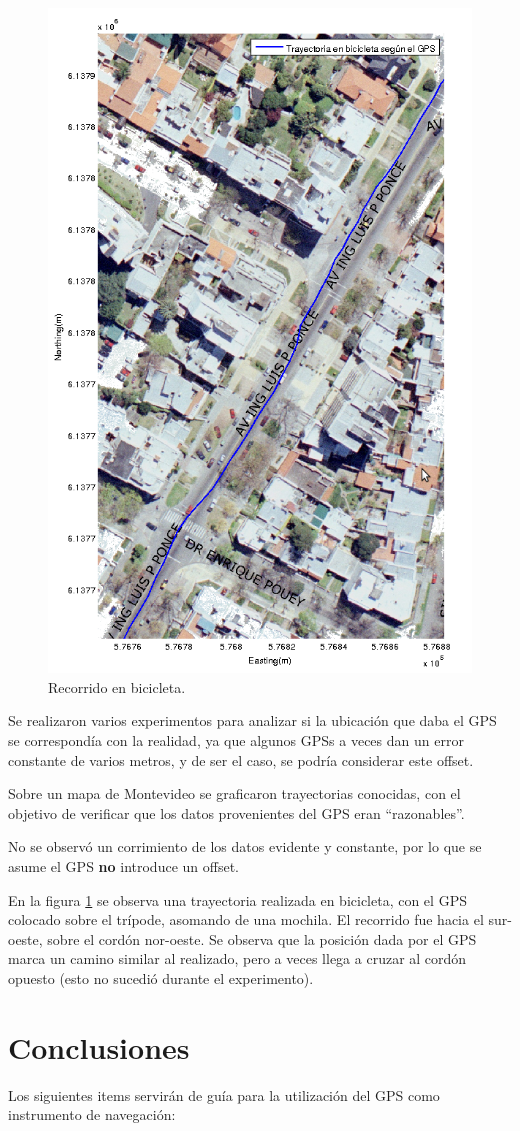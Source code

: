 \documentclass[main]{subfiles}
\begin{document}
\begin{figure}
  \begin{center}
\vspace{-80pt}
  \includegraphics[height=.5\textwidth]{./pics_gps/ponce.png}
  \end{center}
\vspace{-20pt}
  \caption{Recorrido en bicicleta.}
  \label{fig:ponce.png}
\vspace{-10pt}
\end{figure}

Se realizaron varios experimentos para analizar si la ubicación que daba el GPS se correspondía con la realidad, ya que algunos GPSs a veces dan un error constante de varios metros, y de ser el caso, se podría considerar este offset.

Sobre un mapa de Montevideo se graficaron trayectorias conocidas, con el objetivo de verificar que los datos provenientes del GPS eran ``razonables''.

No se observ\'o un corrimiento de los datos evidente y constante, por lo que se asume el GPS \textbf{no} introduce un offset.

En la figura \ref{fig:ponce.png} se observa una trayectoria realizada en bicicleta, con el GPS colocado sobre el trípode, asomando de una mochila. El recorrido fue hacia el sur-oeste, sobre el cord\'on nor-oeste. Se observa que la posici\'on dada por el GPS marca un camino similar al realizado, pero a veces llega a cruzar al cord\'on opuesto (esto no sucedi\'o durante el experimento).

\section{Conclusiones}
\label{sec:conclusion}

Los siguientes items servirán de guía para la utilización del GPS como instrumento de navegación:
\end{document}
